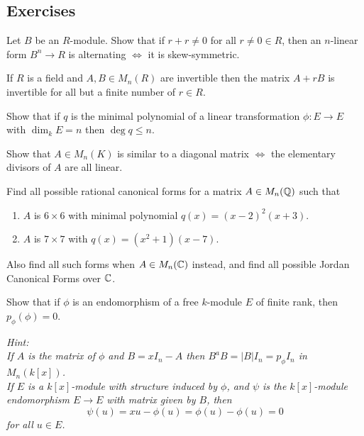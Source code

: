 \subsection{Exercises}

\begin{problem}[Hungerford 7.3.1]
Let $B$ be an $R$-module. Show that if $r+r\neq 0$ for all $r\neq 0 \in R$, then an $n$-linear form $B^n\to R$ is alternating $\iff$ it is skew-symmetric.
\end{problem}

\begin{problem}[Hungerford 7.3.5]
If $R$ is a field and $A, B \in M_n(R)$ are invertible then the matrix $A + rB$ is invertible for all but a finite number of $r\in R$.
\end{problem}

\begin{problem}[Hungerford 7.4.4]
Show that if $q$ is the minimal polynomial of a linear transformation $\phi: E\to E$ with $\dim_k E = n$ then $\deg q \leq n$.
\end{problem}

\begin{problem}[Hungerford 7.4.8]
Show that $A\in M_n(K)$ is similar to a diagonal matrix $\iff$ the elementary divisors of $A$ are all linear.
\end{problem}

\begin{problem}[Hungerford 7.4.10]
Find all possible rational canonical forms for a matrix $A\in M_n(\Bbb Q)$ such that 

\begin{enumerate}
    \item $A$ is $6\times 6$ with minimal polynomial $q(x) = (x-2)^2(x+3)$.
    \item $A$ is $7\times 7$ with $q(x) = (x^2+1)(x-7)$.
\end{enumerate}

Also find all such forms when $A \in M_n(\Bbb C)$ instead, and find all possible Jordan Canonical Forms over $\Bbb C$.
\end{problem}

\begin{problem}[Hungerford 7.5.2]
Show that if $\phi$ is an endomorphism of a free $k$-module $E$ of finite rank, then $p_\phi(\phi) = 0$.

\textit{
Hint: \\
If $A$ is the matrix of $\phi$ and $B = x I_n - A$ then $B^a B = |B| I_n = p_\phi I_n$ in $M_n(k[x])$. \\
If $E$ is a $k[x]$-module with structure induced by $\phi$, and $\psi$ is the $k[x]$-module endomorphism $E\to E$ with matrix given by $B$, then $$\psi(u) = x u -\phi(u) = \phi(u) - \phi(u) = 0$$ for all $u\in E$.
}
\end{problem}

